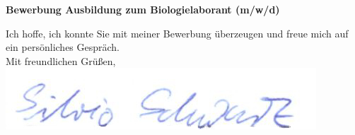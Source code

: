 \documentclass[11pt,a4paper,roman]{moderncv}
\begin{document}
\date{\today}
\opening{\textbf{Bewerbung Ausbildung zum Biologielaborant (m/w/d)
}}
\closing{Ich hoffe, ich konnte Sie mit meiner Bewerbung überzeugen und freue mich auf ein persönliches Gespräch.\\
\vspace{1cm}
Mit freundlichen Grüßen,\\ \vspace{0.2cm}
\includegraphics[scale=0.4]{../../img/Unterschrift_Silvio} \vspace{-1cm}
}
\makelettertitle
\end{document}
